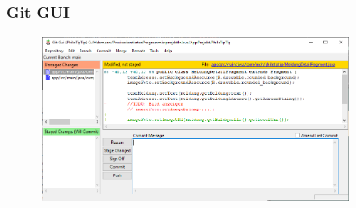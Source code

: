 \begin{frame}
\frametitle{Git GUI}

\begin{figure}
  \includegraphics[width=0.8\textwidth]{figures/gitgui.png}
  \label{fig:gitgui}
\end{figure}

\end{frame}




